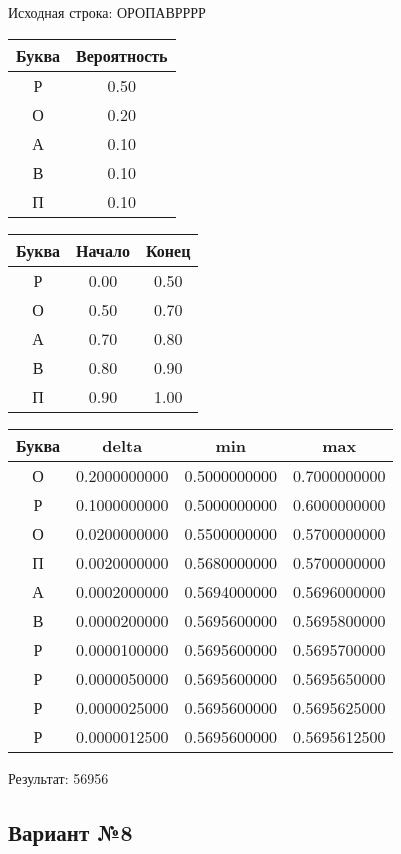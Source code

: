 \documentclass[a4paper, 12pt]{article}
\begin{document}
Исходная строка: ОРОПАВРРРР\
\begin{center}
 \begin{tabular}{ |c|c| } 
  \hline
     Буква & Вероятность \\ \hline
Р & 0.50\\\hline
О & 0.20\\\hline
А & 0.10\\\hline
В & 0.10\\\hline
П & 0.10
\\ \hline \end{tabular}
\end{center}
\begin{center}
 \begin{tabular}{ |c|c|c| } 
  \hline
     Буква & Начало & Конец \\ \hline
Р & 0.00 & 0.50\\\hline
О & 0.50 & 0.70\\\hline
А & 0.70 & 0.80\\\hline
В & 0.80 & 0.90\\\hline
П & 0.90 & 1.00
\\ \hline \end{tabular}
\end{center}
\begin{center}
 \begin{tabular}{ |c|c|c|c| } 
  \hline
     Буква & delta & min & max \\ \hline
О & 0.2000000000 & 0.5000000000 & 0.7000000000\\\hline
Р & 0.1000000000 & 0.5000000000 & 0.6000000000\\\hline
О & 0.0200000000 & 0.5500000000 & 0.5700000000\\\hline
П & 0.0020000000 & 0.5680000000 & 0.5700000000\\\hline
А & 0.0002000000 & 0.5694000000 & 0.5696000000\\\hline
В & 0.0000200000 & 0.5695600000 & 0.5695800000\\\hline
Р & 0.0000100000 & 0.5695600000 & 0.5695700000\\\hline
Р & 0.0000050000 & 0.5695600000 & 0.5695650000\\\hline
Р & 0.0000025000 & 0.5695600000 & 0.5695625000\\\hline
Р & 0.0000012500 & 0.5695600000 & 0.5695612500
\\ \hline \end{tabular}
\end{center}
Результат: 56956
\pagebreak
\subsection{Вариант №8}
\end{document}
